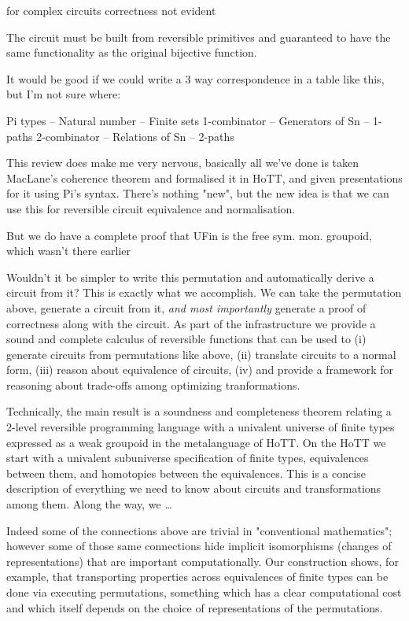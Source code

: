 for complex circuits correctness not evident


The circuit must be built from reversible primitives and guaranteed to have the same functionality as the original bijective function.

It would be good if we could write a 3 way correspondence in a table like this, but I'm not sure where:

Pi types -- Natural number -- Finite sets
1-combinator -- Generators of Sn -- 1-paths
2-combinator -- Relations of Sn -- 2-paths

This review does make me very nervous, basically all we've done is taken MacLane's coherence theorem and formalised it in HoTT, and given presentations for it using Pi's syntax. There's nothing "new", but the new idea is that we can use this for reversible circuit equivalence and normalisation.

But we do have a complete proof that UFin is the free sym. mon. groupoid, which wasn't there earlier

Wouldn't it be simpler to write this permutation and automatically derive a circuit from it? This is exactly what we accomplish. We can take the permutation above, generate a circuit from it, \emph{and most importantly} generate a proof of correctness along with the circuit. As part of the infrastructure we provide a sound and complete calculus of reversible functions that can be used to (i) generate circuits from permutations like above, (ii) translate circuits to a normal form, (iii) reason about equivalence of circuits, (iv) and provide a framework for reasoning about trade-offs among optimizing tranformations.

Technically, the main result is a soundness and completeness theorem relating a 2-level reversible programming language with a univalent universe of finite types expressed as a weak groupoid in the metalanguage of HoTT. On the HoTT we start with a univalent subuniverse specification of finite types, equivalences between them, and homotopies between the equivalences. This is a concise description of everything we need to know about circuits and transformations among them. Along the way, we \ldots {}



  Indeed some of the connections above are trivial in "conventional
mathematics"; however some of those same connections hide implicit
isomorphisms (changes of representations) that are important
computationally.  Our construction shows, for example, that
transporting properties across equivalences of finite types can be
done via executing permutations, something which has a clear
computational cost and which itself depends on the choice of
representations of the permutations.

